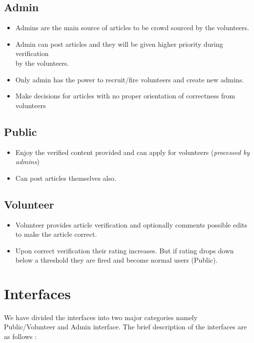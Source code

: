 \documentclass[titlepage,12pt]{article}
\begin{document}
    \subsection{Admin}
    \begin{itemize}
    \setlength\itemsep{0.3em}
        \item Admins are the main source of articles to be crowd sourced by the volunteers.
        \item Admin can post articles and they will be given higher priority during verification \\ by the volunteers.
        \item Only admin has the power to recruit/fire volunteers and create new admins.
        \item Make decisions for articles with no proper orientation of correctness from volunteers
    \end{itemize}
    
    \subsection{Public}
    \begin{itemize}
     \setlength\itemsep{0.3em}
        \item Enjoy the verified content provided and can apply for volunteers (\textit{processed by admins})
        \item Can post articles themselves also.
    \end{itemize}
    
    \subsection{Volunteer}
    \begin{itemize}
     \setlength\itemsep{0.3em}
        \item Volunteer provides article verification and optionally comments possible edits to make the article correct.
        \item Upon correct verification their rating increases. But if rating drops down below a threshold they are fired and become normal users (Public).
    \end{itemize}
\section{Interfaces}
\paragraph{}
   We have divided the interfaces into two major categories namely Public/Volunteer and Admin interface. The brief description of the interfaces are as follows :
\end{document}
